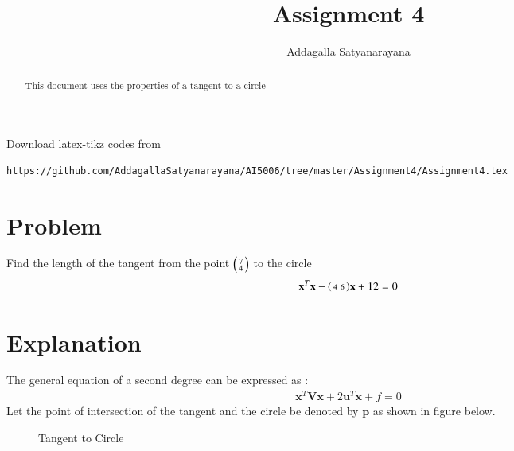 \documentclass[journal,12pt,twocolumn]{IEEEtran}
\begin{document}
	\makeatother
	\let\StandardTheFigure\thefigure
	\let\vec\mathbf
	\renewcommand{\thefigure}{\theproblem}
	\def\putbox#1#2#3{\makebox[0in][l]{\makebox[#1][l]{}\raisebox{\baselineskip}[0in][0in]{\raisebox{#2}[0in][0in]{#3}}}}
	\def\rightbox#1{\makebox[0in][r]{#1}}
	\def\centbox#1{\makebox[0in]{#1}}
	\def\topbox#1{\raisebox{-\baselineskip}[0in][0in]{#1}}
	\def\midbox#1{\raisebox{-0.5\baselineskip}[0in][0in]{#1}}
	\vspace{3cm}
	\title{Assignment 4}
	\author{Addagalla Satyanarayana}
	\maketitle
	\newpage
	\bigskip
	\renewcommand{\thefigure}{\theenumi}
	\renewcommand{\thetable}{\theenumi}
\begin{abstract}
This document uses the properties of a tangent to a circle
\end{abstract}
Download latex-tikz codes from 
%
\begin{lstlisting}
https://github.com/AddagallaSatyanarayana/AI5006/tree/master/Assignment4/Assignment4.tex
\end{lstlisting}
%
\section{Problem}
Find the length of the tangent from the point $\begin{psmallmatrix}7\\4\end{psmallmatrix}$ to the circle
\begin{align}
		 \vec{x}^T\vec{x}- \myvec{4 & 6}\vec{x}+12=0\label{eq:1}
\end{align}
\section{Explanation}
The general equation of a second degree can be expressed as :
\begin{align}
	\vec{x}^T\vec{V}\vec{x}+2\vec{u}^T\vec{x}+f=0\label{gen__quad_eqn}
\end{align}
Let the point of intersection of the tangent and the circle be denoted by $\vec{p}$ as shown in figure below.

\begin{figure}[!ht]
	\centering
	\resizebox{\columnwidth}{!}{}
	\caption{Tangent to Circle }
	\label{fig1:Circle-tangent}
\end{figure}
\end{document}
